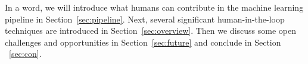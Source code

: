 \fi

In a word, we will introduce what humans can contribute in the machine learning pipeline in Section~\ref{sec:pipeline}. Next, several significant human-in-the-loop techniques are introduced in Section~\ref{sec:overview}. Then we discuss some open challenges and opportunities in Section~\ref{sec:future} and conclude in Section ~\ref{sec:con}.

